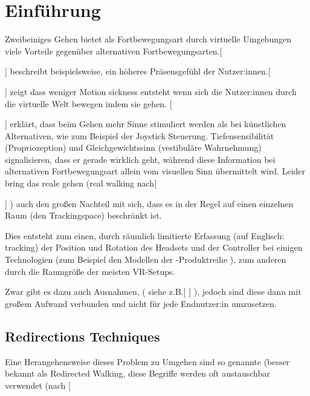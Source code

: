 
\chapter{Einführung}\label{chapter:intro}

Zweibeiniges Gehen bietet als Fortbewegungsart durch virtuelle Umgebungen viele Vorteile gegenüber alternativen Fortbewegungsarten.[

    ]
beschreibt beispielsweise, ein höheres Präsensgefühl der Nutzer:innen.[

]
zeigt dass weniger Motion sickness entsteht wenn sich die Nutzer:innen durch die virtuelle Welt bewegen indem sie gehen.
[

]
erklärt, dass beim Gehen mehr Sinne stimuliert werden als bei künstlichen Alternativen, wie zum Beispiel der Joystick Steuerung. Tiefensensibilität (Propriozeption) und Gleichgewichtssinn (vestibuläre Wahrnehmung) signalisieren, dass er gerade wirklich geht, während diese Information bei alternativen Fortbewegungsart allein vom visuellen Sinn übermittelt wird.
Leider bring das reale gehen (real walking nach[

]
) auch den großen Nachteil mit sich, dass es in der Regel auf einen einzelnen Raum (den Trackingspace) beschränkt ist.

Dies entsteht zum einen, durch räumlich limitierte Erfassung (auf Englisch: tracking) der Position und Rotation des Headsets und der Controller bei einigen Technologien (zum Beispiel den Modellen der -Produktreihe
), zum anderen durch die Raumgröße der meisten VR-Setups.

Zwar gibt es dazu auch Ausnahmen, ( siehe z.B.[
]
), jedoch sind diese dann mit großem Aufwand verbunden und nicht für jede Endnutzer:in umzusetzen.

\section{Redirections Techniques} %
Eine Herangehensweise dieses Problem zu Umgehen sind so genannte  (besser bekannt als Redirected Walking, diese Begriffe werden oft austauschbar verwendet (nach [

